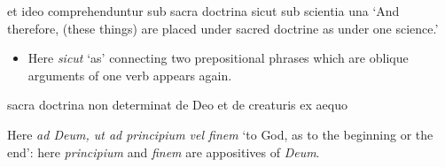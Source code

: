 \documentclass[a4paper, 12pt]{article}
\newcommand{\form}[1]{\emph{#1}}
\newcommand{\translate}[1]{`#1'}
\begin{document}
\begin{exe}
    \ex et ideo comprehenduntur sub sacra doctrina sicut sub scientia una
    \translate{And therefore, (these things) are placed under sacred doctrine as under one science.}
\end{exe}

\begin{itemize}
    \item Here \form{sicut} \translate{as} connecting two prepositional phrases 
    which are oblique arguments of one verb appears again.
\end{itemize}

\begin{exe}
    \ex sacra doctrina non determinat de Deo et de creaturis ex aequo
\end{exe}

\begin{exe}
    \ex Here \form{ad Deum, ut ad principium vel finem} 
    \translate{to God, as to the beginning or the end}: 
    here \form{principium} and \form{finem} are appositives of \form{Deum}.
\end{exe}
\end{document}
